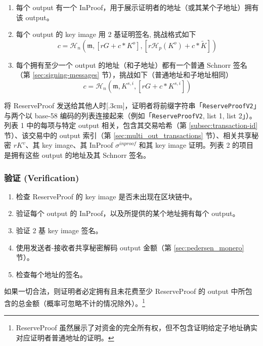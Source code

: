 \begin{enumerate}
    \item 每个 output 有一个 InProof，用于展示证明者的地址（或其某个子地址）拥有该 output。
    \item 每个 output 的 key image 用 2 基证明签名, 挑战格式如下
    \[c = \mathcal{H}_n(\mathfrak{m}, [r G + c*K^o], [r \mathcal{H}_p(K^o) + c*\tilde{K}])\]
    \item 每个拥有至少一个 output 的地址（和子地址）都有一个普通 Schnorr 签名（第 \ref{sec:signing-messages} 节），挑战如下（普通地址和子地址相同）
    \[c = \mathcal{H}_n(\mathfrak{m}, K^{s,i}, [r G + c*K^{s,i}])\]
\end{enumerate}{}

将 ReserveProof 发送给其他人时[.3cm]，证明者将前缀字符串「{\tt ReserveProofV2}」与两个以 base-58 编码的列表连接起来（例如「{\tt ReserveProofV2}, list 1, list 2」）。列表 1 中的每项与特定 output 相关，包含其交易哈希（第 \ref{subsec:transaction-id} 节）、该交易中的 output 索引（第 \ref{sec:multi_out_transactions} 节）、相关共享秘密 $r K^v$、其 key image、其 InProof $\sigma^{inproof}$ 和其 key image 证明。列表 2 的项目是拥有这些 output 的地址及其 Schnorr 签名。

\subsubsection*{验证 (Verification)}

\begin{enumerate}
    \item 检查 ReserveProof 的 key image 是否未出现在区块链中。
    \item 验证每个 output 的 InProof，以及所提供的某个地址拥有每个 output。
    \item 验证 2 基 key image 签名。
    \item 使用发送者-接收者共享秘密解码 output 金额（第 \ref{sec:pedersen_monero} 节）。
    \item 检查每个地址的签名。
\end{enumerate}{}

如果一切合法，则证明者必定拥有且未花费至少 ReserveProof 的 output 中所包含的总金额（概率可忽略不计的情况除外）。\footnote{ReserveProof 虽然展示了对资金的完全所有权，但不包含证明给定子地址确实对应证明者普通地址的证明。}



